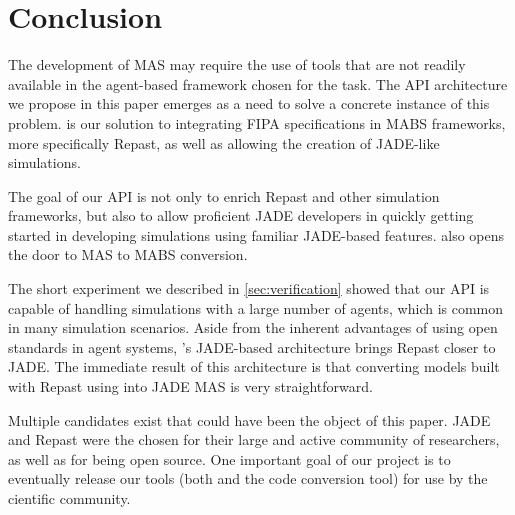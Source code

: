 \section{Conclusion}
\label{sec:conclusion}

The development of MAS may require the use of tools that are not readily available in the agent-based framework chosen for the task. The API architecture we propose in this paper emerges as a need to solve a concrete instance of this problem. \apiname{} is our solution to integrating FIPA specifications in MABS frameworks, more specifically Repast, as well as allowing the creation of JADE-like simulations.

The goal of our API is not only to enrich Repast and other simulation frameworks, but also to allow proficient JADE developers in quickly getting started in developing simulations using familiar JADE-based features. \apiname{} also opens the door to MAS to MABS conversion.

The short experiment we described in \ref{sec:verification} showed that our API is capable of handling simulations with a large number of agents, which is common in many simulation scenarios. Aside from the inherent advantages of using open standards in agent systems, \apiname{}'s JADE-based architecture brings Repast closer to JADE. The immediate result of this architecture is that converting models built with Repast using \apiname{} into JADE MAS is very straightforward.

Multiple candidates exist that could have been the object of this paper. JADE and Repast were the chosen for their large and active community of researchers, as well as for being open source. One important goal of our project is to eventually release our tools (both \apiname{} and the code conversion tool) for use by the cientific community.
